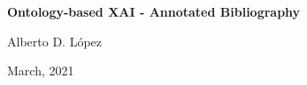 \documentclass[12pt]{article}
\begin{document}
\begin{center}
   {\large\textbf{Ontology-based XAI - Annotated Bibliography}}
\medskip

   {\large   Alberto D. L\'opez

\medskip

           March, 2021
   }
\end{center}
\nocite{*}



\end{document}
